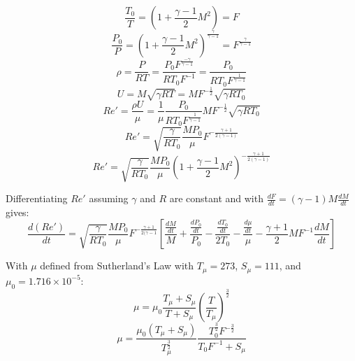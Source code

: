 \begin{equation}
    \frac{T_0}{T} = (1+\frac{\gamma-1}{2}M^2) = F
\end{equation}
\begin{equation}
    \frac{P_0}{P} = (1+\frac{\gamma-1}{2}M^2)^{\frac{\gamma}{\gamma-1}} = F^{\frac{\gamma}{\gamma-1}}
\end{equation}
\begin{equation}
    \rho = \frac{P}{R T} = \frac{P_0 F^{\frac{-\gamma}{\gamma-1}}}{R T_0 F^{-1}} = \frac{P_0}{R T_0 F^{\frac{1}{\gamma-1}}}
\end{equation}
\begin{equation}
    U = M \sqrt{\gamma R T} = M F^{-\frac{1}{2}} \sqrt{\gamma R T_0}
\end{equation}
\begin{equation*}
    Re' = \frac{\rho U}{\mu} = \frac{1}{\mu} \frac{P_0}{R T_0 F^{\frac{1}{\gamma-1}}} M F^{-\frac{1}{2}} \sqrt{\gamma R T_0}
\end{equation*}
\begin{equation}
    Re' = \sqrt{\frac{\gamma}{R T_0}} \frac{M P_0}{\mu} F^{-\frac{\gamma+1}{2(\gamma -1)}}
\end{equation}
\begin{equation}
    Re' = \sqrt{\frac{\gamma}{R T_0}} \frac{M P_0}{\mu} \left(1+\frac{\gamma-1}{2}M^2\right)^{-\frac{\gamma+1}{2(\gamma -1)}}
\end{equation}


\noindent Differentiating $Re'$ assuming $\gamma$ and $R$ are constant and with $\frac{dF}{dt} = (\gamma-1)M \frac{dM}{dt}$ gives:
\begin{equation}
    \frac{d(Re')}{dt} = \sqrt{\frac{\gamma}{R T_0}} \frac{M P_0}{\mu} F^{-\frac{\gamma+1}{2(\gamma -1}} \left[ \frac{\frac{dM}{dt}}{M} + \frac{\frac{dP_0}{dt}}{P_0} - \frac{\frac{dT_0}{dt}}{2T_0} - \frac{\frac{d\mu}{dt}}{\mu} - \frac{\gamma+1}{2} M F^{-1} \frac{dM}{dt} \right]
\end{equation}

\noindent With $\mu$ defined from Sutherland's Law with $T_\mu = 273$, $S_\mu = 111$, and $\mu_0 = 1.716 \times 10^{-5}$:
\begin{equation}
    \mu = \mu_0 \frac{T_\mu+S_\mu}{T+S_\mu} \left( \frac{T}{T_\mu} \right)^{\frac{3}{2}}
\end{equation}
\begin{equation}
    \mu = \frac{\mu_0(T_\mu+S_\mu)}{T_\mu^{\frac{3}{2}}} \frac{T_0^{\frac{3}{2}} F^{-\frac{3}{2}}}{T_0 F^{-1}+S_\mu}
\end{equation}

